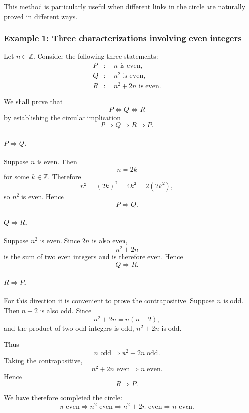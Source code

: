 This method is particularly useful when different links in the circle
are naturally proved in different ways.


\subsubsection*{Example 1: Three characterizations involving even integers}

Let $n\in\mathbb Z$. Consider the following three statements:
\[
\begin{aligned}
P &: \quad n \text{ is even},\\
Q &: \quad n^2 \text{ is even},\\
R &: \quad n^2+2n \text{ is even}.
\end{aligned}
\]

We shall prove that
\[
        P\Longleftrightarrow Q\Longleftrightarrow R
\]
by establishing the circular implication
\[
        P\Longrightarrow Q
        \Longrightarrow R
        \Longrightarrow P.
\]

\paragraph{$P\Rightarrow Q$.}
Suppose $n$ is even. Then
\[
        n=2k
\]
for some $k\in\mathbb Z$. Therefore
\[
        n^2=(2k)^2=4k^2=2(2k^2),
\]
so $n^2$ is even. Hence
\[
        P\Longrightarrow Q.
\]

\paragraph{$Q\Rightarrow R$.}
Suppose $n^2$ is even. Since $2n$ is also even,
\[
        n^2+2n
\]
is the sum of two even integers and is therefore even. Hence
\[
        Q\Longrightarrow R.
\]

\paragraph{$R\Rightarrow P$.}
For this direction it is convenient to prove the contrapositive.
Suppose $n$ is odd. Then $n+2$ is also odd. Since
\[
        n^2+2n=n(n+2),
\]
and the product of two odd integers is odd, $n^2+2n$ is odd.

Thus
\[
        n\text{ odd}
        \Longrightarrow
        n^2+2n\text{ odd}.
\]
Taking the contrapositive,
\[
        n^2+2n\text{ even}
        \Longrightarrow
        n\text{ even}.
\]
Hence
\[
        R\Longrightarrow P.
\]

We have therefore completed the circle:
\[
\boxed{
n\text{ even}
\Longrightarrow
n^2\text{ even}
\Longrightarrow
n^2+2n\text{ even}
\Longrightarrow
n\text{ even}.
}
\]

